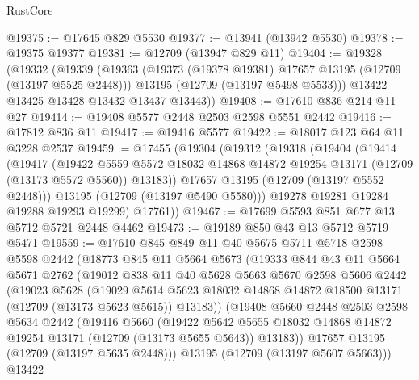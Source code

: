 \begin{lexlean}{RustCore}
\begin{coremodule}
@19375 := @17645 @829 @5530
@19377 := @13941 (@13942 @5530)
@19378 := @19375 @19377
@19381 := @12709 (@13947 @829 @11)
@19404 := @19328
    (@19332
      (@19339
        (@19363
          (@19373 (@19378 @19381) @17657 @13195 (@12709 (@13197 @5525 @2448)))
          @13195
          (@12709 (@13197 @5498 @5533)))
        @13422
        @13425
        @13428
        @13432
        @13437
        @13443))
@19408 := @17610 @836 @214 @11 @27
@19414 := @19408 @5577 @2448 @2503 @2598 @5551 @2442
@19416 := @17812 @836 @11
@19417 := @19416 @5577
@19422 := @18017 @123 @64 @11 @3228 @2537
@19459 := @17455
    (@19304
      (@19312
        (@19318
          (@19404
            (@19414
              (@19417
                (@19422
                  @5559
                  @5572
                  @18032
                  @14868
                  @14872
                  @19254
                  @13171
                  (@12709 (@13173 @5572 @5560))
                  @13183))
              @17657
              @13195
              (@12709 (@13197 @5552 @2448)))
            @13195
            (@12709 (@13197 @5490 @5580)))
          @19278
          @19281
          @19284
          @19288
          @19293
          @19299)
        @17761))
@19467 := @17699 @5593 @851 @677 @13 @5712 @5721 @2448 @4462
@19473 := @19189 @850 @43 @13 @5712 @5719 @5471
@19559 := @17610
    @845
    @849
    @11
    @40
    @5675
    @5711
    @5718
    @2598
    @5598
    @2442
    (@18773
      @845
      @11
      @5664
      @5673
      (@19333
        @844
        @43
        @11
        @5664
        @5671
        @2762
        (@19012
          @838
          @11
          @40
          @5628
          @5663
          @5670
          @2598
          @5606
          @2442
          (@19023
            @5628
            (@19029
              @5614
              @5623
              @18032
              @14868
              @14872
              @18500
              @13171
              (@12709 (@13173 @5623 @5615))
              @13183))
          (@19408
            @5660
            @2448
            @2503
            @2598
            @5634
            @2442
            (@19416
              @5660
              (@19422
                @5642
                @5655
                @18032
                @14868
                @14872
                @19254
                @13171
                (@12709 (@13173 @5655 @5643))
                @13183))
            @17657
            @13195
            (@12709 (@13197 @5635 @2448)))
          @13195
          (@12709 (@13197 @5607 @5663)))
        @13422

\end{coremodule}
\end{lexlean}
